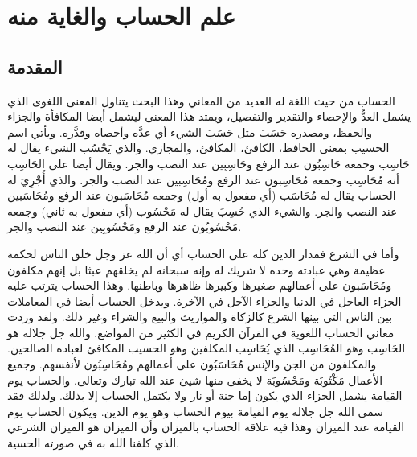 \chapter{علم الحساب والغاية منه}

\section{المقدمة}

الحساب من حيث اللغة له العديد من المعاني وهذا البحث يتناول المعنى اللغوى الذي يشمل العدُّ والإحصاء والتقدير والتفصيل، ويمتد هذا المعنى ليشمل أيضا المكافأة والجزاء والحفظ، ومصدره حَسَبَ مثل حَسَبَ الشيء أي عدَّه وأحصاه وقدَّره. ويأتي اسم الحسيب بمعنى الحافظ، الكافئ، المكافئ، والمجازي. والذي يَحْسُب الشيء يقال له حَاسِب  وجمعه حَاسِبُون عند الرفع  وحَاسِبِين عند النصب والجر. ويقال أيضا على الحَاسِب أنه مُحَاسِب وجمعه مُحَاسِبون عند الرفع ومُحَاسِبين عند النصب والجر. والذي أُجْرِيَ له الحساب يقال له مُحَاسَب (أي مفعول به أول) وجمعه مُحَاسَبون عند الرفع ومُحَاسَبين عند النصب والجر. والشيء الذي حُسِبَ يقال له مَحْسُوب (أي مفعول به ثاني) وجمعه مَحْسُوبُون عند الرفع ومَحْسُوبِين عند النصب والجر. 

وأما في الشرع فمدار الدين كله على الحساب أي أن الله عز وجل خلق الناس لحكمة عظيمة وهي عبادته وحده لا شريك له وإنه سبحانه لم يخلقهم عبثا بل إنهم مكلفون ومُحَاسَبون على أعمالهم صغيرها وكبيرها ظاهرها وباطنها. وهذا الحساب يترتب عليه الجزاء العاجل في الدنيا والجزاء الآجل في الآخرة. ويدخل الحساب أيضا في المعاملات بين الناس التي بينها الشرع كالزكاة والمواريث والبيع والشراء وغير ذلك. ولقد وردت معاني الحساب اللغوية في القرآن الكريم في الكثير من المواضع. والله جل جلاله هو الحَاسِب وهو المُحَاسِب الذي يُحَاسِب المكلفين وهو الحسيب المكافئ لعباده الصالحين. والمكلفون من الجن والإنس مُحَاسَبُون على أعمالهم ومُحَاسِبُون لأنفسهم. وجميع الأعمال مَكْتُوبَة ومَحْسُوبَة لا يخفى منها شيئ عند الله تبارك وتعالى. والحساب يوم القيامة يشمل الجزاء الذي يكون إما جنة أو نار ولا يكتمل الحساب إلا بذلك. ولذلك فقد سمى الله جل جلاله يوم القيامة بيوم الحساب وهو يوم الدين. ويكون الحساب يوم القيامة عند الميزان وهذا فيه علاقة الحساب بالميزان وأن الميزان هو الميزان الشرعي الذي كلفنا الله به في صورته الحسية. 


